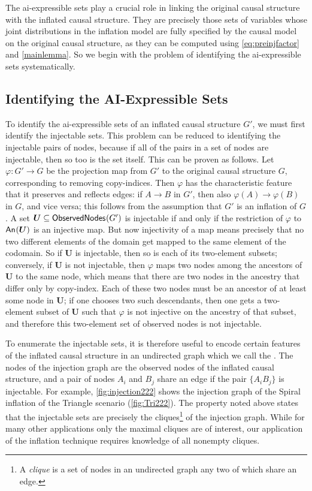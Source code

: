 \documentclass[aps,english,10pt,superscriptaddress,onecolumn,twoside,longbibliography,pra,floatfix,fleqn,nofootinbib]{revtex4-1}
\newcommand*{\tblue}[1]{{\color{MidnightBlue}{\textbf{#1}}}}
\theoremstyle{definition}
\newcounter{example}[section]
\newcommand{\An}[2][]{{\mathsf{An}_{#1}}\parenths{#2}}
\newcommand{\SmallNamedFunction}[3][]{\operatorname{\mathsf{#2}}_{#1}\parenths{#3}}
\newcommand{\obsnodes}[1]{\SmallNamedFunction{ObservedNodes}{#1}}
\DeclarePairedDelimiter{\parenths}{\lparen}{\rparen}
\begin{document}
The ai-expressible sets play a crucial role in linking the original causal structure with the inflated causal structure.  They are precisely those sets of variables whose joint distributions in the inflation model are fully specified by the causal model on the original causal structure, as they can be computed using \cref{eq:preinjfactor} and \cref{mainlemma}. So we begin with the problem of identifying the ai-expressible sets systematically.

\subsection{Identifying the AI-Expressible Sets}
\label{step:findpreinjectable}

To identify the ai-expressible sets of an inflated causal structure $G'$, we must first identify the injectable sets. This problem can be reduced to identifying the injectable pairs of nodes, because if all of the pairs in a set of nodes are injectable, then so too is the set itself. This can be proven as follows.   
Let $\varphi : G' \to G$ be the projection map from $G'$ to the original causal structure $G$, corresponding to removing copy-indices.  Then $\varphi$ has the characteristic feature that it preserves and reflects edges: if $A  \to B$ in $G'$, then also $\varphi(A) \to \varphi(B)$ in $G$, and vice versa; this follows from the assumption that $G'$ is an inflation of $G$. 
A set $\bm{U} \subseteq \obsnodes{G'}$ is injectable if and only if the
restriction of $\varphi$ to $\An{\bm{U}}$ is an injective map. 
But now injectivity of a map means precisely that no two different
elements of the domain get mapped to the same element of the codomain.
So if $\bm{U}$ is injectable, then so is each of its two-element subsets;
conversely, if $\bm{U}$ is not injectable, then $\varphi$ maps two nodes among the
ancestors of $\bm{U}$ to the same node, which means that there are two nodes in the
ancestry that differ only by copy-index. Each of these two nodes must be
an ancestor of at least some node in $\bm{U}$; if one chooses two such
descendants, then one gets a two-element subset of $\bm{U}$ such that $\varphi$ is not
injective on the ancestry of that subset, and therefore this two-element
set of observed nodes is not injectable.

To enumerate the injectable sets, it is therefore useful to encode certain features of the inflated causal structure in an undirected graph which we call the \tblue{injection graph}. The nodes of the injection graph are the observed nodes of the inflated causal structure, and a pair of nodes $A_i$ and $B_j$ share an edge if the pair $\{ A_i B_j\}$ is injectable. For example, \cref{fig:injection222} shows the injection graph of the Spiral inflation of the Triangle scenario (\cref{fig:Tri222}).
The property noted above states that the injectable sets are precisely the cliques\footnote{A \emph{clique} is a set of nodes in an undirected graph any two of which share an edge.} of the injection graph.
While for many other applications only the maximal cliques are of interest, our application of the inflation technique requires knowledge of all nonempty cliques. 
\end{document}
